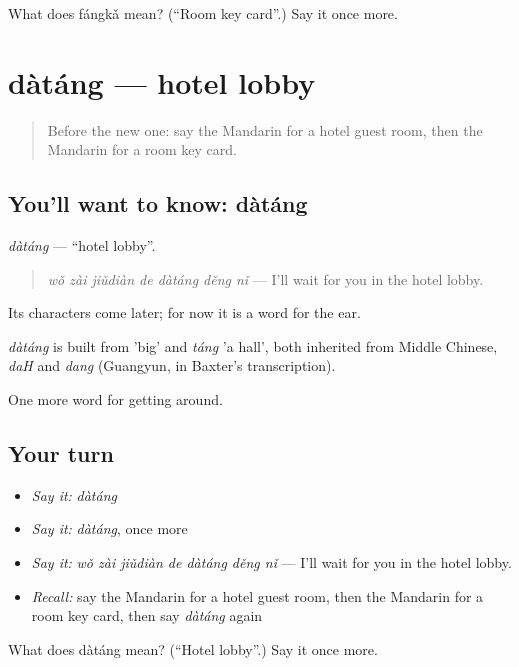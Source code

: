 \begin{tcolorbox}[breakable,colback=teal!4,colframe=teal!35!black,title={Before you move on}]
What does fángkǎ mean? (\textquotedblleft{}Room key card\textquotedblright{}.) Say it once more.
\end{tcolorbox}
\section[dàtáng]{dàtáng — hotel lobby}

\label{lesson:ZH-C425-datang}



\begin{quote}
Before the new one: say the Mandarin for a hotel guest room, then the Mandarin for a room key card.
\end{quote}

\subsection*{You'll want to know: dàtáng}
\emph{dàtáng} — \textquotedblleft{}hotel lobby\textquotedblright{}.

\begin{quote}
\emph{wǒ zài jiǔdiàn de dàtáng děng nǐ} — I'll wait for you in the hotel lobby.
\end{quote}

Its characters come later; for now it is a word for the ear.

\begin{cousinweb}
\emph{dàtáng} is built from  'big' and \emph{táng} 'a hall', both inherited from Middle Chinese, \emph{daH} and \emph{dang} (Guangyun, in Baxter's transcription).
\end{cousinweb}

\begin{grammarlens}[title={What you've built}]
One more word for getting around.
\end{grammarlens}

\subsection*{Your turn}
\begin{itemize}
\raggedright
  \item \emph{Say it:} \emph{dàtáng}
  \item \emph{Say it:} \emph{dàtáng}, once more
  \item \emph{Say it:} \emph{wǒ zài jiǔdiàn de dàtáng děng nǐ} — I'll wait for you in the hotel lobby.
  \item \emph{Recall:} say the Mandarin for a hotel guest room, then the Mandarin for a room key card, then say \emph{dàtáng} again
\end{itemize}

\begin{tcolorbox}[breakable,colback=teal!4,colframe=teal!35!black,title={Before you move on}]
What does dàtáng mean? (\textquotedblleft{}Hotel lobby\textquotedblright{}.) Say it once more.
\end{tcolorbox}
